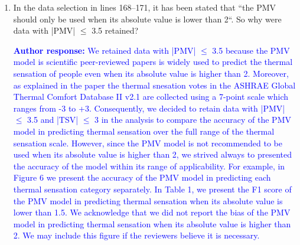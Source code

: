 \documentclass[a4paper, 10pt]{letter}
\newcommand{\response}[1]{\textcolor{blue}{\textbf{Author response:} #1}}
\begin{document}
\begin{letter}
\begin{enumerate}
            \response{
                We made the decision to include all the data in the ASHRAE Global Thermal Comfort Database II v2.1 in the analysis regardless of the environmental type.
                This is because the PMV model, being a heat balance model, can be used to predict thermal sensation in a wide range of environments.
                Our aims was to determine the accuracy of the PMV model in predicting thermal sensation as a function of the input parameters.
                Environmental type is not an input parameter of the PMV model, hence we did not consider it in the analysis.
                We are aware that previous studies have shown that the PMV model may have limitations in predicting thermal sensation in non mechanically ventilated environments.
                However, since both standards do not specify the type of environments for which the PMV model can be used, we decided to include all the data in the ASHRAE Global Thermal Comfort Database II v2.1 in the analysis.
                It should be noted that we did not include data from outdoor environments in the analysis since the ASHRAE Global Thermal Comfort Database II v2.1 only includes data from ``real'' buildings occupied by ``real'' people doing their normal day-to-day activities.
                The database does not include data from outdoor environments nor from climate chambers studies.
            }

            \item In the data selection in lines 168--171, it has been stated that ``the PMV should only be used when its absolute value is lower than 2``.
            So why were data with |PMV| $\leq$ 3.5 retained?

            \response{
            We retained data with |PMV| $\leq$ 3.5 because the PMV model is scientific peer-reviewed papers is widely used to predict the thermal sensation of people even when its absolute value is higher than 2.
            Moreover, as explained in the paper the thermal snesation votes in the ASHRAE Global Thermal Comfort Database II v2.1 are collected using a 7-point scale which ranges from -3 to +3.
            Consequently, we decided to retain data with |PMV| $\leq$ 3.5 and |TSV| $\leq$ 3 in the analysis to compare the accuracy of the PMV model in predicting thermal sensation over the full range of the thermal sensation scale.
            However, since the PMV model is not recommended to be used when its absolute value is higher than 2, we strived always to presented the accuracy of the model within its range of applicability.
            For example, in Figure 6 we present the accuracy of the PMV model in predicting each thermal sensation category separately.
            In Table 1, we present the F1 score of the PMV model in predicting thermal sensation when its absolute value is lower than 1.5.
            We acknowledge that we did not report the bias of the PMV model in predicting thermal sensation when its absolute value is higher than 2.
            We may include this figure if the reviewers believe it is necessary.
            }


\end{enumerate}
\end{letter}
\end{document}
